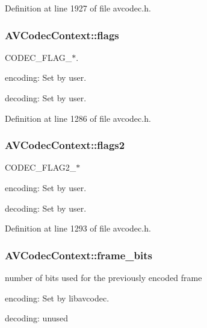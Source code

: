 Definition at line 1927 of file avcodec.\+h.

\subsubsection[{\texorpdfstring{flags}{flags}}]{ A\+V\+Codec\+Context\+::flags}\hypertarget{struct_a_v_codec_context_abb01e291550fa3fb96188af4d494587e}{}\label{struct_a_v_codec_context_abb01e291550fa3fb96188af4d494587e}
C\+O\+D\+E\+C\+\_\+\+F\+L\+A\+G\+\_\+$\ast$.
\begin{DoxyItemize}
\item encoding\+: Set by user.
\item decoding\+: Set by user. 
\end{DoxyItemize}

Definition at line 1286 of file avcodec.\+h.

\subsubsection[{\texorpdfstring{flags2}{flags2}}]{ A\+V\+Codec\+Context\+::flags2}\hypertarget{struct_a_v_codec_context_a1944f9a4f8f2e123c087e1fe7613d571}{}\label{struct_a_v_codec_context_a1944f9a4f8f2e123c087e1fe7613d571}
C\+O\+D\+E\+C\+\_\+\+F\+L\+A\+G2\+\_\+$\ast$
\begin{DoxyItemize}
\item encoding\+: Set by user.
\item decoding\+: Set by user. 
\end{DoxyItemize}

Definition at line 1293 of file avcodec.\+h.

\subsubsection[{\texorpdfstring{frame\+\_\+bits}{frame_bits}}]{ A\+V\+Codec\+Context\+::frame\+\_\+bits}\hypertarget{struct_a_v_codec_context_a9ffba99ce690996d839032cd3b0be299}{}\label{struct_a_v_codec_context_a9ffba99ce690996d839032cd3b0be299}
number of bits used for the previously encoded frame
\begin{DoxyItemize}
\item encoding\+: Set by libavcodec.
\item decoding\+: unused 
\end{DoxyItemize}

